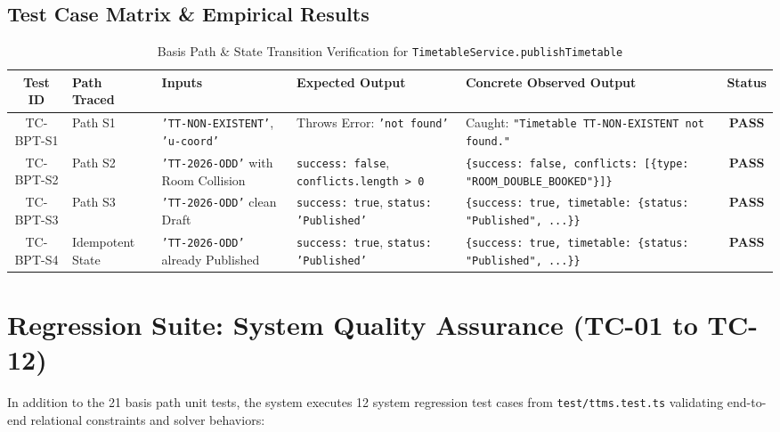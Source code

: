 \documentclass[11pt,a4paper]{article}
\begin{document}
\subsection{Test Case Matrix \& Empirical Results}
\begin{table}[H]
\centering
\scriptsize
\begin{tabular}{@{}clp{3.2cm}p{3.5cm}p{3.8cm}c@{}}
\toprule
\textbf{Test ID} & \textbf{Path Traced} & \textbf{Inputs} & \textbf{Expected Output} & \textbf{Concrete Observed Output} & \textbf{Status} \\ \midrule
TC-BPT-S1 & Path S1 & \texttt{'TT-NON-EXISTENT'}, \texttt{'u-coord'} & Throws Error: \texttt{'not found'} & Caught: \texttt{"Timetable TT-NON-EXISTENT not found."} & \textbf{PASS} \\
TC-BPT-S2 & Path S2 & \texttt{'TT-2026-ODD'} with Room Collision & \texttt{success: false}, \texttt{conflicts.length > 0} & \texttt{\{success: false, conflicts: [\{type: "ROOM\_DOUBLE\_BOOKED"\}]\}} & \textbf{PASS} \\
TC-BPT-S3 & Path S3 & \texttt{'TT-2026-ODD'} clean Draft & \texttt{success: true}, \texttt{status: 'Published'} & \texttt{\{success: true, timetable: \{status: "Published", ...\}\}} & \textbf{PASS} \\
TC-BPT-S4 & Idempotent State & \texttt{'TT-2026-ODD'} already Published & \texttt{success: true}, \texttt{status: 'Published'} & \texttt{\{success: true, timetable: \{status: "Published", ...\}\}} & \textbf{PASS} \\ \bottomrule
\end{tabular}
\caption{Basis Path \& State Transition Verification for \texttt{TimetableService.publishTimetable}}
\end{table}

\newpage
\section{Regression Suite: System Quality Assurance (TC-01 to TC-12)}
In addition to the 21 basis path unit tests, the system executes 12 system regression test cases from \texttt{test/ttms.test.ts} validating end-to-end relational constraints and solver behaviors:
\end{document}
